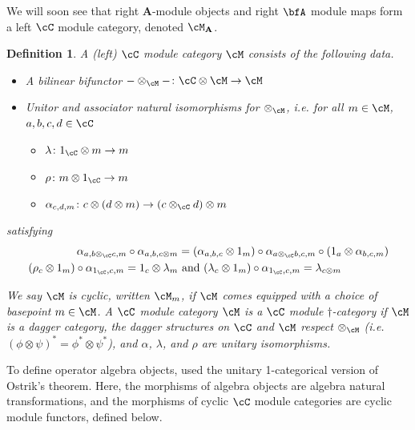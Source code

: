 \documentclass[11pt,reqno]{amsart}
\newcommand{\bb}[1]{\mathbf{#1}}
\numberwithin{equation}{section}
\theoremstyle{plain}
\newtheorem{defn}[thm]{Definition}
\begin{document}
We will soon see that right $\bb A$-module objects and right $\bfA$ module maps form a left $\cC$ module category, denoted $\cM_{\bb A}$.

\begin{defn} A (left) $\cC$ module category $\cM$ consists of the following data.
	\begin{itemize}
	\item A bilinear bifunctor $-\otimes_{\cM}- \colon \cC \otimes \cM \to \cM$
	\item Unitor and associator natural isomorphisms for $\otimes_{\cM}$, i.e. for all $m \in \cM$, $a, b, c, d \in \cC$
		\begin{itemize}
		\item $\lambda \colon 1_{\cC} \otimes m \to m$
		\item $\rho \colon m \otimes 1_{\cC} \to m$
		\item $\alpha_{c,d,m} \colon c \otimes (d \otimes m) \to (c \otimes_{\cC} d) \otimes m$
		\end{itemize}
	\end{itemize}
satisfying
\begin{align*}
\alpha_{a, b \otimes_{\cC} c, m} \circ \alpha_{a, b, c \otimes m} &= (\alpha_{a, b, c} \otimes 1_m) \circ \alpha_{a \otimes_{\cC} b, c, m} \circ (1_a \otimes \alpha_{b, c, m})\\
(\rho_c \otimes 1_m) \circ \alpha_{1_{\cC}, c, m} = 1_c \otimes \lambda_m &\text{ and }
(\lambda_c \otimes 1_m) \circ \alpha_{1_{\cC},c,m} = \lambda_{c \otimes m}
\end{align*}

We say $\cM$ is cyclic, written $\cM_m$, if $\cM$ comes equipped with a choice of basepoint $m \in \cM$.
A $\cC$ module category $\cM$ is a $\cC$ module $\dagger$-category if $\cM$ is a dagger category, the dagger structures on $\cC$ and $\cM$ respect $\otimes_{\cM}$ (i.e. $(\phi \otimes \psi)^* = \phi^* \otimes \psi^*$), and $\alpha$, $\lambda$, and $\rho$ are unitary isomorphisms.
\end{defn}

To define operator algebra objects, \cite{JP17} used the unitary 1-categorical version of Ostrik's theorem.
Here, the morphisms of algebra objects are algebra natural transformations, and the morphisms of cyclic $\cC$ module categories are cyclic module functors, defined below.
\end{document}
